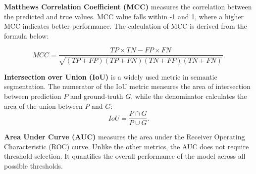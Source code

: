 \documentclass[10pt,journal,compsoc]{IEEEtran}
\begin{document}
\noindent\textbf{Matthews Correlation Coefficient (MCC)} measures the correlation between the predicted and true values. MCC value falls within -1 and 1, where a higher MCC indicates better  performance. The calculation of MCC is derived from the formula below:  

\begin{equation}
    \label{MCC}
 MCC = \frac{TP \times TN - FP \times FN} {\sqrt{(TP+FP)(TP+FN)(TN+FP)(TN+FN)}}.
\end{equation}

\noindent\textbf{Intersection over Union (IoU)} is a widely used metric in semantic segmentation. 
The numerator of the IoU metric measures the area of intersection between prediction $P$ and ground-truth $G$, while the denominator calculates the area of the union between $P$ and $G$: 
\begin{equation}
    \label{IoU}
     IoU = \frac{P \cap G}{P \cup G}.
\end{equation}
 

\noindent\textbf{Area Under Curve (AUC)} measures the area under the Receiver Operating Characteristic (ROC) curve. Unlike the other metrics, the AUC does not require threshold selection. It quantifies the overall performance of the model across all possible thresholds. 
\end{document}
